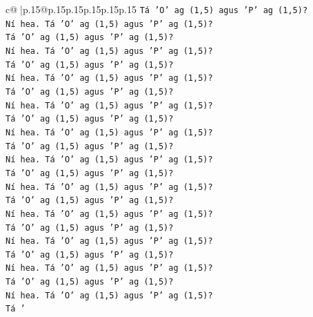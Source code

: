 \documentclass{article}
\begin{document}
{\begin{supertabular}{c@{$\;$}|p{.15\linewidth}@{}p{.15\linewidth}p{.15\linewidth}p{.15\linewidth}p{.15\linewidth}p{.15\linewidth}}
{{{\texttt{Tá 'O' ag (1,5) agus 'P' ag (1,5)?} \\
\texttt{Ní hea. Tá 'O' ag (1,5) agus 'P' ag (1,5)?} \\
\texttt{Tá 'O' ag (1,5) agus 'P' ag (1,5)?} \\
\texttt{Ní hea. Tá 'O' ag (1,5) agus 'P' ag (1,5)?} \\
\texttt{Tá 'O' ag (1,5) agus 'P' ag (1,5)?} \\
\texttt{Ní hea. Tá 'O' ag (1,5) agus 'P' ag (1,5)?} \\
\texttt{Tá 'O' ag (1,5) agus 'P' ag (1,5)?} \\
\texttt{Ní hea. Tá 'O' ag (1,5) agus 'P' ag (1,5)?} \\
\texttt{Tá 'O' ag (1,5) agus 'P' ag (1,5)?} \\
\texttt{Ní hea. Tá 'O' ag (1,5) agus 'P' ag (1,5)?} \\
\texttt{Tá 'O' ag (1,5) agus 'P' ag (1,5)?} \\
\texttt{Ní hea. Tá 'O' ag (1,5) agus 'P' ag (1,5)?} \\
\texttt{Tá 'O' ag (1,5) agus 'P' ag (1,5)?} \\
\texttt{Ní hea. Tá 'O' ag (1,5) agus 'P' ag (1,5)?} \\
\texttt{Tá 'O' ag (1,5) agus 'P' ag (1,5)?} \\
\texttt{Ní hea. Tá 'O' ag (1,5) agus 'P' ag (1,5)?} \\
\texttt{Tá 'O' ag (1,5) agus 'P' ag (1,5)?} \\
\texttt{Ní hea. Tá 'O' ag (1,5) agus 'P' ag (1,5)?} \\
\texttt{Tá 'O' ag (1,5) agus 'P' ag (1,5)?} \\
\texttt{Ní hea. Tá 'O' ag (1,5) agus 'P' ag (1,5)?} \\
\texttt{Tá 'O' ag (1,5) agus 'P' ag (1,5)?} \\
\texttt{Ní hea. Tá 'O' ag (1,5) agus 'P' ag (1,5)?} \\
\texttt{Tá '} \\
            }
        }
    }
     \\ \\


\end{supertabular}}
\end{document}

